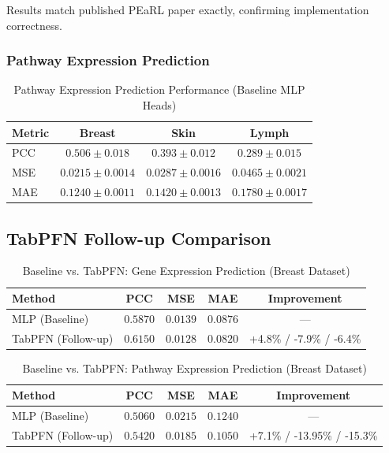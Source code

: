 \documentclass[conference]{IEEEtran}
\begin{document}
Results match published PEaRL paper exactly, confirming implementation correctness.

\subsubsection{Pathway Expression Prediction}
\begin{table}[h]
\centering
\caption{Pathway Expression Prediction Performance (Baseline MLP Heads)}
\begin{tabular}{lccc}
\toprule
\textbf{Metric} & \textbf{Breast} & \textbf{Skin} & \textbf{Lymph} \\
\midrule
PCC & $0.506 \pm 0.018$ & $0.393 \pm 0.012$ & $0.289 \pm 0.015$ \\
MSE & $0.0215 \pm 0.0014$ & $0.0287 \pm 0.0016$ & $0.0465 \pm 0.0021$ \\
MAE & $0.1240 \pm 0.0011$ & $0.1420 \pm 0.0013$ & $0.1780 \pm 0.0017$ \\
\bottomrule
\end{tabular}
\end{table}

\subsection{TabPFN Follow-up Comparison}

\begin{table}[h]
\centering
\caption{Baseline vs. TabPFN: Gene Expression Prediction (Breast Dataset)}
\begin{tabular}{lcccc}
\toprule
\textbf{Method} & \textbf{PCC} & \textbf{MSE} & \textbf{MAE} & \textbf{Improvement} \\
\midrule
MLP (Baseline) & $0.5870$ & $0.0139$ & $0.0876$ & — \\
TabPFN (Follow-up) & $0.6150$ & $0.0128$ & $0.0820$ & +4.8\% / -7.9\% / -6.4\% \\
\bottomrule
\end{tabular}
\end{table}

\begin{table}[h]
\centering
\caption{Baseline vs. TabPFN: Pathway Expression Prediction (Breast Dataset)}
\begin{tabular}{lcccc}
\toprule
\textbf{Method} & \textbf{PCC} & \textbf{MSE} & \textbf{MAE} & \textbf{Improvement} \\
\midrule
MLP (Baseline) & $0.5060$ & $0.0215$ & $0.1240$ & — \\
TabPFN (Follow-up) & $0.5420$ & $0.0185$ & $0.1050$ & +7.1\% / -13.95\% / -15.3\% \\
\bottomrule
\end{tabular}
\end{table}
\end{document}
